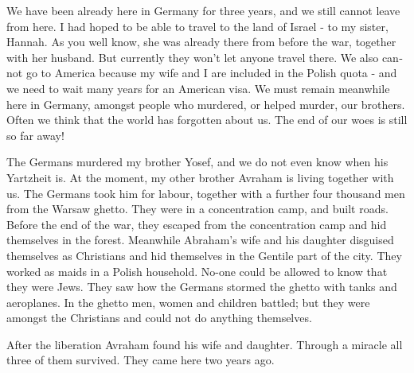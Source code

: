 \documentclass{article}
\begin{document}
\begin{pairs}
\begin{Leftside}
\begin{english}
\beginnumbering

\autopar
We have been already here in Germany for three years, and we still cannot leave from here.
I had hoped to be able to travel to the land of Israel - to my sister, Hannah.
As you well know, she was already there from before the war, together with her husband.
But currently they won't let anyone travel there.
We also cannot go to America because my wife and I are included in the Polish quota - and we need to wait many years for an American visa.
We must remain meanwhile here in Germany, amongst people who murdered, or helped murder, our brothers.
Often we think that the world has forgotten about us. The end of our woes is still so far away!


The Germans murdered my brother Yosef, and we do not even know when his Yartzheit is.
 At the moment, my other brother Avraham is living together with us.
 The Germans took him for labour, together with a further four thousand men from the Warsaw ghetto.
 They were in a concentration camp, and built roads.
 Before the end of the war, they escaped from the concentration camp and hid themselves in the forest.
 Meanwhile Abraham's wife and his daughter disguised themselves as Christians and hid themselves in the Gentile part of the city.
 They worked as maids in a Polish household.
 No-one could be allowed to know that they were Jews.
 They saw how the Germans stormed the ghetto with tanks and aeroplanes.
 In the ghetto men, women and children battled; but they were amongst the Christians and could not do anything themselves.
 
 
 After the liberation Avraham found his wife and daughter.
 Through a miracle all three of them survived.
 They came here two years ago.
 
\endnumbering
\end{english}
\end{Leftside}

\end{pairs}
\Columns
\end{document}

